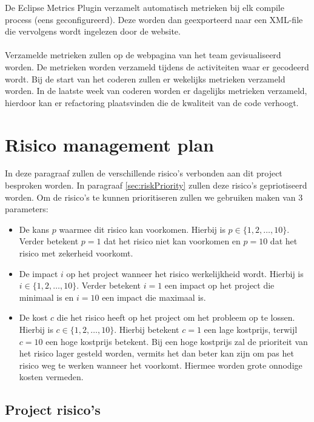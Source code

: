 De Eclipse Metrics Plugin verzamelt automatisch metrieken bij elk compile process (eens geconfigureerd). Deze worden dan geexporteerd naar een XML-file die vervolgens wordt ingelezen door de website.
\\
\\
Verzamelde metrieken zullen op de webpagina van het team gevisualiseerd worden. De metrieken worden verzameld tijdens de activiteiten waar er gecodeerd wordt. Bij de start van het coderen zullen er wekelijks metrieken verzameld worden. In de laatste week van coderen worden er dagelijks metrieken verzameld, hierdoor kan er refactoring plaatsvinden die de kwaliteit van de code verhoogt.

\section{Risico management plan} \label{sec:risicoManagementPlan}
In deze paragraaf zullen de verschillende risico's verbonden aan dit project besproken worden. In paragraaf \ref{sec:riskPriority} zullen deze risico's gepriotiseerd worden. Om de risico's te kunnen prioritiseren zullen we gebruiken maken van 3 parameters:
\begin{itemize}
	\item 
		De kans $p$ waarmee dit risico kan voorkomen. Hierbij is $ p \in \{1, 2, \ldots , 10\} $. Verder betekent $p = 1$ dat het risico niet kan voorkomen en $p = 10$ dat het risico met zekerheid voorkomt.
	\item 
		De impact $i$ op het project wanneer het risico werkelijkheid wordt. Hierbij is $ i \in \{1, 2, \ldots , 10\} $. Verder betekent $i = 1$ een impact op het project die minimaal is en $i = 10$ een impact die maximaal is.
	\item 
		De kost $c$ die het risico heeft op het project om het probleem op te lossen. Hierbij is $ c \in \{1, 2, \ldots , 10\} $. Hierbij betekent $c = 1$ een lage kostprijs, terwijl $c=10$ een hoge kostprijs betekent. Bij een hoge kostprijs zal de prioriteit van het risico lager gesteld worden, vermits het dan beter kan zijn om pas het risico weg te werken wanneer het voorkomt. Hiermee worden grote onnodige kosten vermeden.
		
\end{itemize}
\subsection{Project risico's}
